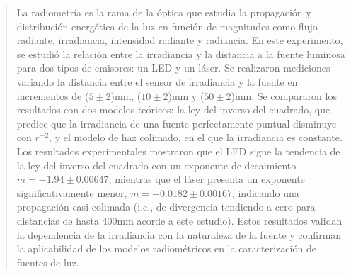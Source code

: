 \begin{abstract}
La radiometría es la rama de la óptica que estudia la propagación y distribución energética de la luz en función de magnitudes como flujo radiante, irradiancia, intensidad radiante y radiancia. En este experimento, se estudió la relación entre la irradiancia y la distancia a la fuente luminosa para dos tipos de emisores: un LED y un láser. Se realizaron mediciones variando la distancia entre el sensor de irradiancia y la fuente en incrementos de ($5 \pm 2$)mm, ($10 \pm 2$)mm y ($50 \pm 2$)mm. Se compararon los resultados con dos modelos teóricos: la ley del inverso del cuadrado, que predice que la irradiancia de una fuente perfectamente puntual disminuye con \( r^{-2} \), y el modelo de haz colimado, en el que la irradiancia es constante. Los resultados experimentales mostraron que el LED sigue la tendencia de la ley del inverso del cuadrado con un exponente de decaimiento \( m = -1.94 \pm 0.00647 \), mientras que el láser presenta un exponente significativamente menor, \( m = -0.0182 \pm 0.00167 \), indicando una propagación casi colimada (i.e., de divergencia tendiendo a cero para distancias de hasta 400mm acorde a este estudio). Estos resultados validan la dependencia de la irradiancia con la naturaleza de la fuente y confirman la aplicabilidad de los modelos radiométricos en la caracterización de fuentes de luz.
\end{abstract}